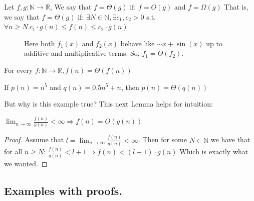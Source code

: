 \begin{definition}
Let \( f, g : \mathbb{N} \rightarrow \mathbb{R} \), We say that \(f = \Theta(g)\) if:
\(f = O(g)\) and \(f = \Omega(g)\)
That is, we say that \(f = \Theta(g)\) if:
\( \exists N \in \mathbb{N}, \exists c_1, c_2 > 0\) s.t. \(\forall n \ge N \ c_1\cdot g(n) \le f(n) \le c_2 \cdot g(n)\)
\end{definition}


\begin{figure}[h]
  \label{fig:bigTheta}
\caption{Here both $f_{1}(x)$ and $f_{2}(x)$ behave like $\sim  x+ \sin(x)$ up to additive and multiplicative terms. So, $f_{1} = \Theta(f_{2})$.} 
\end{figure}



\begin{example} For every \(f : \mathbb{N} \rightarrow \mathbb{R}, f(n) = \Theta(f(n))\) \end{example}
\begin{example} If \(p(n) = n^5\) and \(q(n) = 0.5n^5 + n\), then \(p(n) = \Theta(q(n))\)\end{example}
But why is this example true? This next Lemma helps for intuition:
\begin{lemma}
  \( \lim_{n \rightarrow \infty} \frac{f(n)}{g(n)} < \infty \Rightarrow f(n) = O(g(n)) \)
\end{lemma}

\begin{proof} Assume that \(l = \lim_{n \rightarrow \infty} \frac{f(n)}{g(n)} < \infty\). Then for some \(N \in \mathbb{N}\) we have that for all \(n \ge N\):
\( \frac{f(n)}{g(n)} < l + 1 \Rightarrow f(n) < (l + 1) · g(n) \)
Which is exactly what we wanted.
\end{proof}
\subsection{Examples with proofs.}

